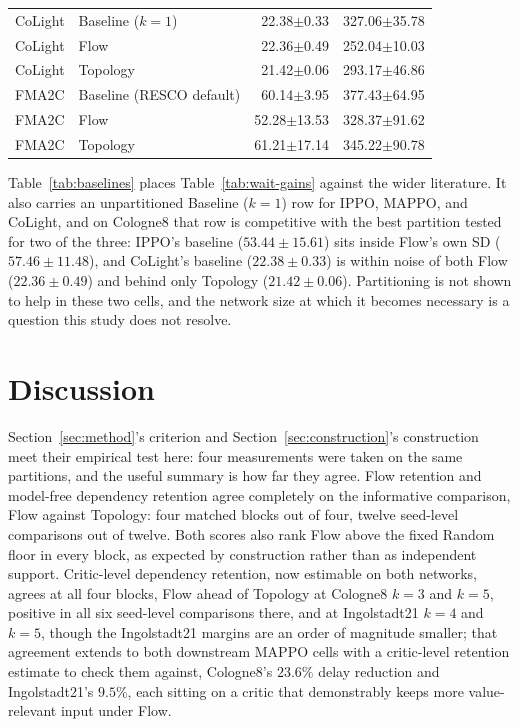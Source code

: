 \documentclass[journal]{IEEEtran}
\theoremstyle{definition}
\begin{document}
\begin{table}[t]
\begin{tabular}{llrr}
        \addlinespace
        CoLight       & Baseline ($k{=}1$)       & 22.38$\pm$0.33  & 327.06$\pm$35.78  \\
        CoLight       & Flow                     & 22.36$\pm$0.49  & 252.04$\pm$10.03  \\
        CoLight       & Topology                 & 21.42$\pm$0.06  & 293.17$\pm$46.86  \\
        \addlinespace
        FMA2C         & Baseline (RESCO default) & 60.14$\pm$3.95  & 377.43$\pm$64.95  \\
        FMA2C         & Flow                     & 52.28$\pm$13.53 & 328.37$\pm$91.62  \\
        FMA2C         & Topology                 & 61.21$\pm$17.14 & 345.22$\pm$90.78  \\
        \bottomrule
    \end{tabular}
\end{table}

Table~\ref{tab:baselines} places Table~\ref{tab:wait-gains} against the wider literature. It also carries an unpartitioned Baseline ($k{=}1$) row for IPPO, MAPPO, and CoLight, and on Cologne8 that row is competitive with the best partition tested for two of the three: IPPO's baseline ($53.44\pm15.61$) sits inside Flow's own SD ($57.46\pm11.48$), and CoLight's baseline ($22.38\pm0.33$) is within noise of both Flow ($22.36\pm0.49$) and behind only Topology ($21.42\pm0.06$). Partitioning is not shown to help in these two cells, and the network size at which it becomes necessary is a question this study does not resolve.

\section{Discussion}
\label{sec:discussion}

Section~\ref{sec:method}'s criterion and Section~\ref{sec:construction}'s construction meet their empirical test here: four measurements were taken on the same partitions, and the useful summary is how far they agree. Flow retention and model-free dependency retention agree completely on the informative comparison, Flow against Topology: four matched blocks out of four, twelve seed-level comparisons out of twelve. Both scores also rank Flow above the fixed Random floor in every block, as expected by construction rather than as independent support. Critic-level dependency retention, now estimable on both networks, agrees at all four blocks, Flow ahead of Topology at Cologne8 $k=3$ and $k=5$, positive in all six seed-level comparisons there, and at Ingolstadt21 $k=4$ and $k=5$, though the Ingolstadt21 margins are an order of magnitude smaller; that agreement extends to both downstream MAPPO cells with a critic-level retention estimate to check them against, Cologne8's $23.6\%$ delay reduction and Ingolstadt21's $9.5\%$, each sitting on a critic that demonstrably keeps more value-relevant input under Flow.
\end{document}
